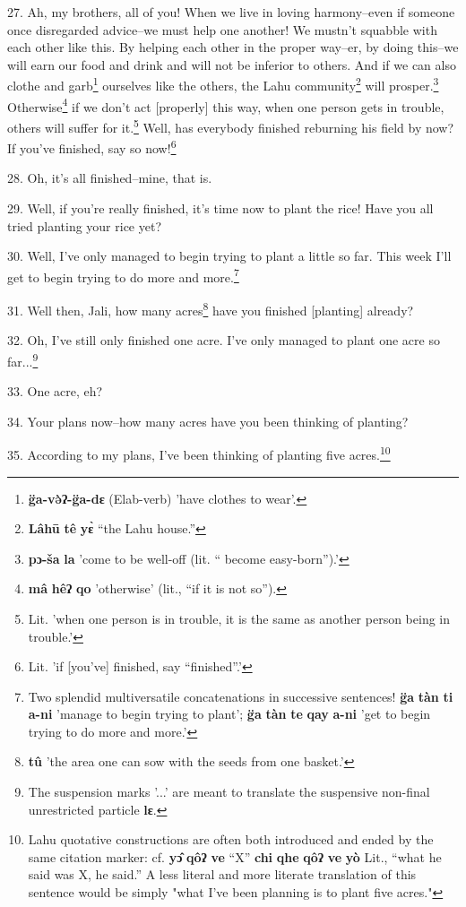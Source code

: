 27. Ah, my brothers, all of you! When we live in loving harmony--even if someone
once disregarded advice--we must help one another! We mustn't squabble with each
other like this. By helping each other in the proper way--er, by doing this--we
will earn our food and drink and will not be inferior to others. And if we can
also clothe and garb\footnote{\textbf{g̈a-və̀ʔ-g̈a-dɛ} (Elab-verb) 'have clothes to wear'.} ourselves like the others, the Lahu community\footnote{\textbf{Lâhū} \textbf{tê} \textbf{yɛ̀} ``the Lahu house.''} will
prosper.\footnote{\textbf{pɔ-ša} \textbf{la} 'come to be well-off (lit. `` become easy-born'').'} Otherwise\footnote{\textbf{mâ} \textbf{hêʔ} \textbf{qo} 'otherwise' (lit., ``if it is not so'').} if we don't act [properly] this way, when one person
gets in trouble, others will suffer for it.\footnote{Lit. 'when one person is in trouble, it is the same as another person being in trouble.'} Well, has everybody finished reburning
his field by now? If you've finished, say so now!\footnote{Lit. 'if [you've] finished, say ``finished''.'}

28. Oh, it's all finished--mine, that is.

29. Well, if you're really finished, it's time now to plant the rice! Have you
all tried planting your rice yet?

30. Well, I've only managed to begin trying to plant a little so far. This week
I'll get to begin trying to do more and more.\footnote{Two splendid multiversatile concatenations in successive sentences! \textbf{g̈a} \textbf{tàn} \textbf{ti} \textbf{a-ni} 'manage to begin trying to plant'; \textbf{g̈a} \textbf{tàn} \textbf{te} \textbf{qay} \textbf{a-ni} 'get to begin trying to do more and more.'}

31. Well then, Jali, how many acres\footnote{\textbf{tû} 'the area one can sow with the seeds from one basket.'} have you finished [planting] already?

32. Oh, I've still only finished one acre. I've only managed to plant one acre
so far...\footnote{The suspension marks '...' are meant to translate the suspensive non-final unrestricted particle \textbf{lɛ}.}

33. One acre, eh?

34. Your plans now--how many acres have you been thinking of planting?

35. According to my plans, I've been thinking of planting five acres.\footnote{Lahu quotative constructions are often both introduced and ended by the same citation marker: cf. \textbf{yɔ̂} \textbf{qôʔ} \textbf{ve} ``X'' \textbf{chi} \textbf{qhe} \textbf{qôʔ} \textbf{ve} \textbf{yò} Lit., ``what he said was X, he said.'' A less literal and more literate translation of this sentence would be simply "what I've been planning is to plant five acres."}

